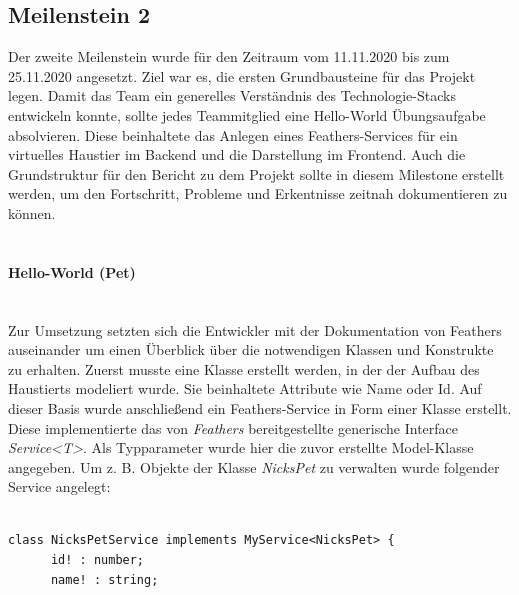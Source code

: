 \documentclass[10pt, a4paper]{article}
\begin{document}
\begin{onehalfspace}
\subsection{Meilenstein 2}
Der zweite Meilenstein wurde für den Zeitraum vom 11.11.2020 bis zum 25.11.2020 angesetzt.
Ziel war es, die ersten Grundbausteine für das Projekt legen. Damit das Team ein generelles Verständnis des Technologie-Stacks entwickeln konnte,
sollte jedes Teammitglied eine \glqq Hello-World\grqq{} Übungsaufgabe absolvieren. Diese beinhaltete das Anlegen eines Feathers-Services für ein virtuelles
Haustier im Backend und die Darstellung im Frontend. Auch die Grundstruktur für den Bericht zu dem Projekt sollte in diesem Milestone erstellt werden,
um den Fortschritt, Probleme und Erkentnisse zeitnah dokumentieren zu können.
\\~\\
\paragraph*{Hello-World (Pet)} $~$ \\
\label{HelloWorld}
Zur Umsetzung setzten sich die Entwickler mit der Dokumentation von Feathers auseinander um einen
Überblick über die notwendigen Klassen und Konstrukte zu erhalten. Zuerst musste eine Klasse erstellt werden, in der der Aufbau des Haustierts modeliert
wurde. Sie beinhaltete Attribute wie \glqq Name\grqq{} oder \glqq Id\grqq. Auf dieser Basis wurde anschließend ein Feathers-Service in Form einer
Klasse erstellt. Diese implementierte das von \textit{Feathers} bereitgestellte generische Interface \textit{Service<T>}. Als Typparameter wurde hier
die zuvor erstellte Model-Klasse angegeben. Um z. B. Objekte der Klasse \textit{NicksPet} zu verwalten wurde folgender Service angelegt:
\\~\\
\begin{minipage}{\textwidth}
  \begin{lstlisting}[caption={NicksPetService (Hello World)}, captionpos=b]
    class NicksPetService implements MyService<NicksPet> {
      id! : number;
      name! : string;


\end{lstlisting}
\end{minipage}
\end{onehalfspace}
\end{document}
